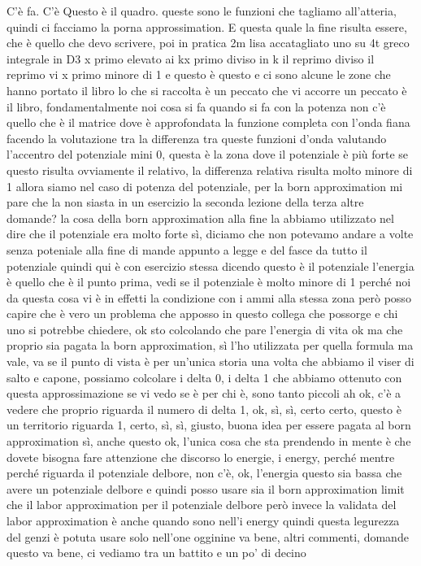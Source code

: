 \begin{soluzione}
   C'è fa. C'è Questo è il quadro. queste sono le funzioni che tagliamo all'atteria, quindi ci facciamo la porna approssimation. E questa quale la fine risulta essere, che è quello che devo scrivere, poi in pratica 2m lisa accatagliato uno su 4t greco integrale in D3 x primo elevato ai kx primo diviso in k il reprimo diviso il reprimo vi x primo minore di 1 e questo è questo e ci sono alcune le zone che hanno portato il libro lo che si raccolta è un peccato che vi accorre un peccato è il libro, fondamentalmente noi cosa si fa quando si fa con la potenza non c'è quello che è il matrice dove è approfondata la funzione completa con l'onda fiana facendo la volutazione tra la differenza tra queste funzioni d'onda valutando l'accentro del potenziale mini 0, questa è la zona dove il potenziale è più forte se questo risulta ovviamente il relativo, la differenza relativa risulta molto minore di 1 allora siamo nel caso di potenza del potenziale, per la born approximation mi pare che la non siasta in un esercizio la seconda lezione della terza altre domande? la cosa della born approximation alla fine la abbiamo utilizzato nel dire che il potenziale era molto forte sì, diciamo che non potevamo andare a volte senza poteniale alla fine di mande appunto a legge e del fasce da tutto il potenziale quindi qui è con esercizio stessa dicendo questo è il potenziale l'energia è quello che è il punto prima, vedi se il potenziale è molto minore di 1 perché noi da questa cosa vi è in effetti la condizione con i ammi alla stessa zona però posso capire che è vero un problema che apposso in questo collega che possorge e chi uno si potrebbe chiedere, ok sto colcolando che pare l'energia di vita ok ma che proprio sia pagata la born approximation, sì l'ho utilizzata per quella formula ma vale, va se il punto di vista è per un'unica storia una volta che abbiamo il viser di salto e capone, possiamo colcolare i delta 0, i delta 1 che abbiamo ottenuto con questa approssimazione se vi vedo se è per chi è, sono tanto piccoli ah ok, c'è a vedere che proprio riguarda il numero di delta 1, ok, sì, sì, certo certo, questo è un territorio riguarda 1, certo, sì, sì, giusto, buona idea per essere pagata al born approximation sì, anche questo ok, l'unica cosa che sta prendendo in mente è che dovete bisogna fare attenzione che discorso lo energie, i energy, perché mentre perché riguarda il potenziale delbore, non c'è, ok, l'energia questo sia bassa che avere un potenziale delbore e quindi posso usare sia il born approximation limit che il labor approximation per il potenziale delbore però invece la validata del labor approximation è anche quando sono nell'i energy quindi questa legurezza del genzi è potuta usare solo nell'one ogginine va bene, altri commenti, domande questo va bene, ci vediamo tra un battito e un po' di decino
\end{soluzione}

